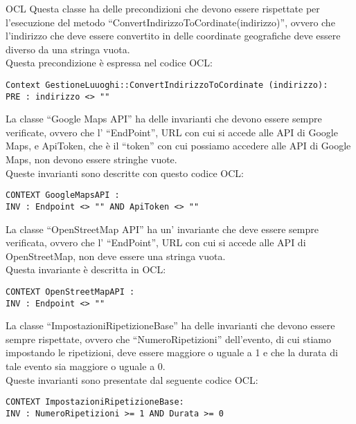 \begin{listaPersonale}{OCL}
    Questa classe ha delle precondizioni che devono essere rispettate per l’esecuzione del metodo “ConvertIndirizzoToCordinate(indirizzo)”, ovvero che l’indirizzo che deve essere convertito in delle coordinate geografiche deve essere diverso da una stringa vuota.\\
    Questa precondizione è espressa nel codice OCL:

    \begin{lstlisting}
Context GestioneLuuoghi::ConvertIndirizzoToCordinate (indirizzo):
PRE : indirizzo <> ""
    \end{lstlisting}




    La classe “Google Maps API” ha delle invarianti che devono essere sempre verificate, ovvero che l’ “EndPoint”, URL con cui si accede alle API di Google Maps, e ApiToken, che è il “token” con cui possiamo accedere alle API di Google  Maps, non devono essere stringhe vuote.\\
    Queste invarianti sono descritte con questo codice OCL: 
    \begin{lstlisting}
CONTEXT GoogleMapsAPI :
INV : Endpoint <> "" AND ApiToken <> ""
    \end{lstlisting}




    La classe “OpenStreetMap API” ha un’ invariante che deve essere sempre verificata, ovvero che l’ “EndPoint”, URL con cui si accede alle API di OpenStreetMap, non deve essere una stringa vuota. \\
    Questa invariante è descritta in OCL: 
    \begin{lstlisting}
CONTEXT OpenStreetMapAPI :
INV : Endpoint <> ""
    \end{lstlisting}




    La classe “ImpostazioniRipetizioneBase” ha delle invarianti che devono essere sempre rispettate, ovvero che “NumeroRipetizioni” dell’evento, di cui stiamo impostando le ripetizioni, deve essere maggiore o uguale a 1 e che la durata di tale evento sia maggiore o uguale a 0. \\
    Queste invarianti sono presentate dal seguente codice OCL:

    \begin{lstlisting}
CONTEXT ImpostazioniRipetizioneBase:
INV : NumeroRipetizioni >= 1 AND Durata >= 0
    \end{lstlisting}





\end{listaPersonale}
